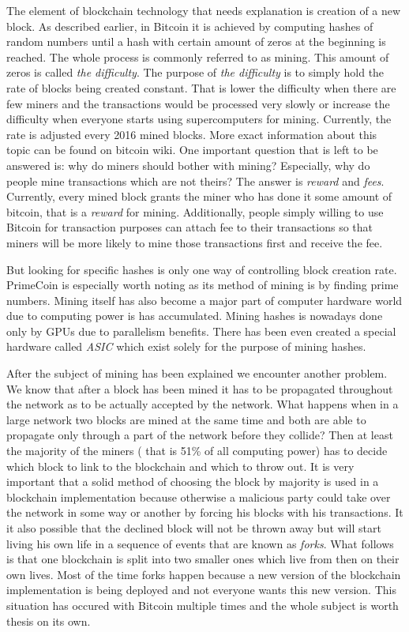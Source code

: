 \documentclass[a4paper,12pt,twoside,openany]{report}
\begin{document}
The element of blockchain technology that needs explanation is creation of a new block. As described earlier, in Bitcoin it is achieved by computing hashes of random numbers until a hash with certain amount of zeros at the beginning is reached. The whole process is commonly referred to as mining. This amount of zeros is called \textit{the difficulty}. The purpose of \textit{the difficulty} is to simply hold the rate of blocks being created constant. That is lower the difficulty when there are few miners and the transactions would be processed very slowly or increase the difficulty when everyone starts using supercomputers for mining. Currently, the rate is adjusted every 2016 mined blocks. More exact information about this topic can be found on bitcoin wiki.\cite{Bitcoinwiki} One important question that is left to be answered is: why do miners should bother with mining? Especially, why do people mine transactions which are not theirs? The answer is \textit{reward} and \textit{fees}. Currently, every mined block grants the miner who has done it some amount of bitcoin, that is a \textit{reward} for mining. Additionally, people simply willing to use Bitcoin for transaction purposes can attach fee to their transactions so that miners will be more likely to mine those transactions first and receive the fee. 

But looking for specific hashes is only one way of controlling block creation rate. PrimeCoin is especially worth noting as its method of mining is by finding prime numbers. Mining itself has also become a major part of computer hardware world due to computing power is has accumulated. Mining hashes is nowadays done only by GPUs due to parallelism benefits. There has been even created a special hardware called \textit{ASIC} which exist solely for the purpose of mining hashes.

After the subject of mining has been explained we encounter another problem. We know that after a block has been mined it has to be propagated throughout the network as to be actually accepted by the network.
What happens when in a large network two blocks are mined at the same time and both are able to propagate only through a part of the network before they collide? Then at least the majority of the miners ( that is 51\% of all computing power) has to decide which block to link to the blockchain and which to throw out. It is very important that a solid method of choosing the block by majority is used in a blockchain implementation because otherwise a malicious party could take over the network in some way or another by forcing his blocks with his transactions. It it also possible that the declined block will not be thrown away but will start living his own life in a sequence of events that are known as \textit{forks}. What follows is that one blockchain is split into two smaller ones which live from then on their own lives. Most of the time forks happen because a new version of the blockchain implementation is being deployed and not everyone wants this new version. This situation has occured with Bitcoin multiple times and the whole subject is worth thesis on its own.
\end{document}
